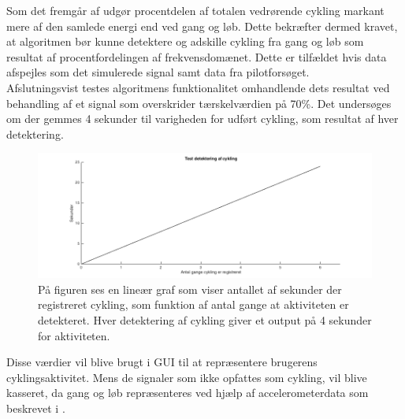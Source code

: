 Som det fremgår af  udgør procentdelen af totalen vedrørende cykling markant mere af den samlede energi end ved gang og løb. Dette bekræfter dermed kravet, at algoritmen bør kunne detektere og adskille cykling fra gang og løb som resultat af procentfordelingen af frekvensdomænet. Dette er tilfældet hvis data afspejles som det simulerede signal samt data fra pilotforsøget. \\
Afslutningsvist testes algoritmens funktionalitet omhandlende dets resultat ved behandling af et signal som overskrider tærskelværdien på 70\%. Det undersøges om der gemmes 4 sekunder til varigheden for udført cykling, som resultat af hver detektering.
\begin{figure}[H]
	\centering
	\includegraphics[width=.7\textwidth]{figures/cDesign/sim_n_c.png}
	\caption{På figuren ses en lineær graf som viser antallet af sekunder der registreret cykling, som funktion af antal gange at aktiviteten er detekteret. Hver detektering af cykling giver et output på 4 sekunder for aktiviteten.}
	\label{fig:sim_n_cykling}
\end{figure}

Disse værdier vil blive brugt i GUI til at repræsentere brugerens cyklingsaktivitet. Mens de signaler som ikke opfattes som cykling, vil blive kasseret, da gang og løb repræsenteres ved hjælp af accelerometerdata som beskrevet i . 